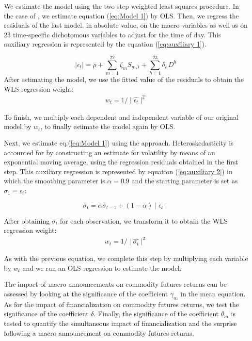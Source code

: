 \documentclass[12pt]{article}
\begin{document}
We estimate the model using the two-step weighted least squares procedure. In the case of \citet{andersen2007real}, we estimate equation (\ref{eq:Model 1}) by OLS. Then, we regress the residuals of the last model, in absolute value, on the macro variables as well as on 23 time-specific dichotomous variables to adjust for the time of day. This auxiliary regression is represented by the equation (\ref{eq:auxiliary 1}).

\begin{equation}\label{eq:auxiliary 1}
\mid \epsilon_{t} \mid=\rho+\sum_{m=1}^{22} \zeta_m S_{m,t}+\sum_{h=1}^{23} \delta_h D^h
\end{equation}
After estimating the model, we use the fitted value of the residuals to obtain the WLS regression weight:
\begin{align*}
w_t=1/\mid \hat{\epsilon_t} \mid^2
\end{align*}

To finish, we multiply each dependent and independent variable of our original model by $w_t$, to finally estimate the model again by OLS.

Next, we estimate eq.(\ref{eq:Model 1}) using the \citet{kurov2019price} approach. Heteroskedasticity is accounted for by constructing an estimate for volatility by means of an exponential moving average, using the regression residuals obtained in the first step. This auxiliary regression is represented by equation (\ref{eq:auxiliary 2}) in which the smoothing parameter is $\alpha=0.9$ and the starting parameter is set as $\sigma_1=\epsilon_t$:

\begin{equation}\label{eq:auxiliary 2}
\sigma_t=\alpha \sigma_{t-1}+(1-\alpha) \mid \epsilon_t \mid 
\end{equation} 

After obtaining  $\sigma_t$ for each observation, we transform it to obtain the WLS regression weight:
\begin{align*}
w_t=1/\mid \hat{\sigma_t} \mid^2
\end{align*}

As with the previous equation, we complete this step by multiplying each variable by  $w_t$ and we run an OLS regression to estimate the model.%

 The impact of macro announcements on commodity futures returns  can be assessed by looking at the significance of the coefficient $\gamma_m$ in the mean equation. As for the impact of financialization on commodity futures returns, we test the significance of the coefficient $\delta$. Finally, the significance of the coefficient $\theta_m$ is tested to quantify the simultaneous impact of financialization and the surprise following a macro announcement on commodity futures returns.
 
\end{document}
